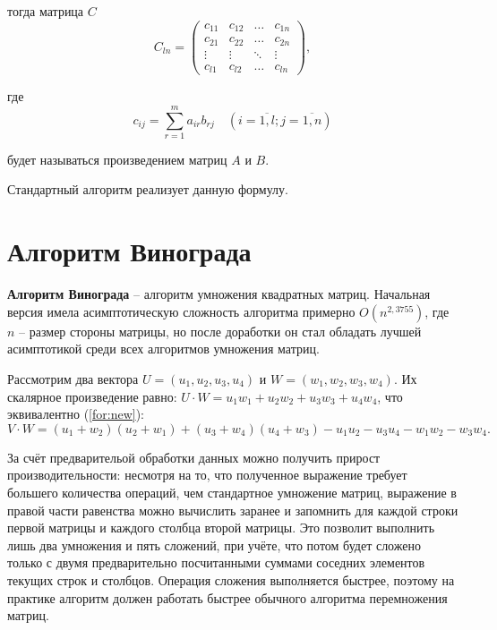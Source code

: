 тогда матрица $C$
\begin{equation}
	C_{ln} = \begin{pmatrix}
		c_{11} & c_{12} & \ldots & c_{1n}\\
		c_{21} & c_{22} & \ldots & c_{2n}\\
		\vdots & \vdots & \ddots & \vdots\\
		c_{l1} & c_{l2} & \ldots & c_{ln}
	\end{pmatrix},
\end{equation}

где
\begin{equation}
	\label{eq:M}
	c_{ij} =
	\sum_{r=1}^{m} a_{ir}b_{rj} \quad (i=\overline{1,l}; j=\overline{1,n})
\end{equation}

будет называться произведением матриц $A$ и $B$.

Стандартный алгоритм реализует данную формулу.


\section{Алгоритм Винограда}

\textbf{Алгоритм Винограда} \cite{vinograd-matrix} -- алгоритм умножения квадратных матриц. Начальная версия имела асимптотическую сложность алгоритма примерно $O(n^{2,3755})$, где $n$ -- размер стороны матрицы, но после доработки он стал обладать лучшей асимптотикой среди всех алгоритмов умножения матриц.

Рассмотрим два вектора $U = (u_1, u_2, u_3, u_4)$ и $W = (w_1, w_2, w_3, w_4)$.
Их скалярное произведение равно: $U \cdot W = u_1w_1 + u_2w_2 + u_3w_3 + u_4w_4$, что эквивалентно (\ref{for:new}):
\begin{equation}
	\label{for:new}
	V \cdot W = (u_1 + w_2)(u_2 + w_1) + (u_3 + w_4)(u_4 + w_3) - u_1u_2 - u_3u_4 - w_1w_2 - w_3w_4.
\end{equation}

За счёт предварительой обработки данных можно получить прирост производительности: несмотря на то, что  полученное выражение требует большего количества операций, чем стандартное умножение матриц, выражение в правой части равенства можно вычислить заранее и запомнить для каждой строки первой матрицы и каждого столбца второй матрицы. 
Это позволит выполнить лишь два умножения и пять сложений, при учёте, что потом будет сложено только с двумя предварительно посчитанными суммами соседних элементов текущих строк и столбцов. 
Операция сложения выполняется быстрее, поэтому на практике алгоритм должен работать быстрее обычного алгоритма перемножения матриц.

